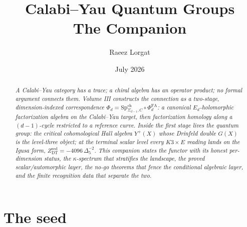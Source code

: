 \documentclass[11pt]{article}
\title{\bfseries Calabi--Yau Quantum Groups\\[0.4em]\Large The Companion}
\author{Raeez Lorgat}
\date{July 2026}
\providecommand{\PhiFA}{\Phi^{\mathrm{FA}}}
\providecommand{\SpCh}{\mathrm{Sp}^{\mathrm{ch}}}
\providecommand{\Dfive}{\Delta_5}
\begin{document}
\maketitle

\begin{abstract}
\noindent\itshape
A Calabi--Yau category has a trace; a chiral algebra has an operator
product; no formal argument connects them. Volume III constructs the
connection as a two-stage, dimension-indexed correspondence
$\Phi_d=\SpCh_{\Sigma_{d-1},C}\circ\PhiFA_d$: a canonical
$E_d$-holomorphic factorization algebra on the Calabi--Yau target,
then factorization homology along a $(d{-}1)$-cycle restricted to a
reference curve. Inside the first stage lives the quantum group: the
critical cohomological Hall algebra $Y^+(X)$ whose Drinfeld double
$G(X)$ is the level-three object; at the terminal scalar level every
$K3\times E$ reading lands on the Igusa form,
$Z_{\mathrm{DT}}^{\mathrm{red}}=-4096\,\Dfive^{-2}$. This companion
states the functor with its honest per-dimension status, the
$\kappa$-spectrum that stratifies the landscape, the proved
scalar/automorphic layer, the no-go theorems that fence the
conditional algebraic layer, and the finite recognition data that
separate the two.
\end{abstract}

\section{The seed}\label{sec:seed}
\end{document}
